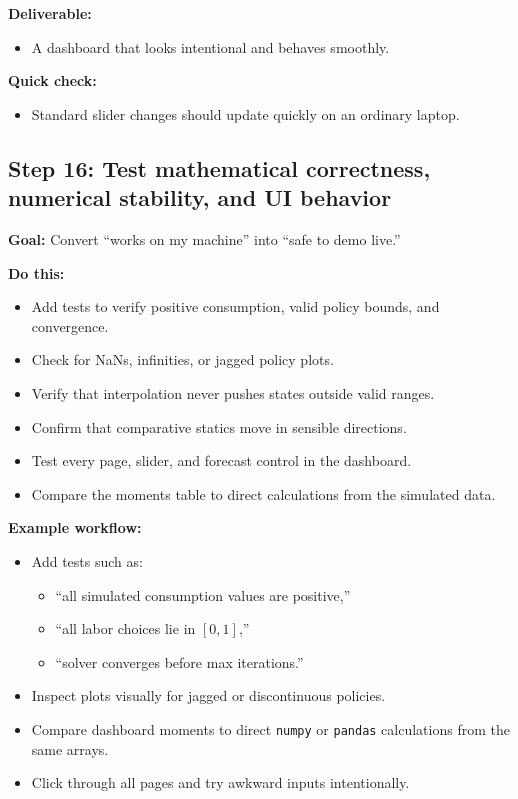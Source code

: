 \documentclass[11pt]{article}
\begin{document}
\textbf{Deliverable:}
\begin{itemize}
    \item A dashboard that looks intentional and behaves smoothly.
\end{itemize}

\textbf{Quick check:}
\begin{itemize}
    \item Standard slider changes should update quickly on an ordinary laptop.
\end{itemize}

\subsection{Step 16: Test mathematical correctness, numerical stability, and UI behavior}
\textbf{Goal:} Convert ``works on my machine'' into ``safe to demo live.''

\textbf{Do this:}
\begin{itemize}
    \item Add tests to verify positive consumption, valid policy bounds, and convergence.
    \item Check for NaNs, infinities, or jagged policy plots.
    \item Verify that interpolation never pushes states outside valid ranges.
    \item Confirm that comparative statics move in sensible directions.
    \item Test every page, slider, and forecast control in the dashboard.
    \item Compare the moments table to direct calculations from the simulated data.
\end{itemize}

\textbf{Example workflow:}
\begin{itemize}
    \item Add tests such as:
    \begin{itemize}
        \item ``all simulated consumption values are positive,''
        \item ``all labor choices lie in \([0,1]\),''
        \item ``solver converges before max iterations.''
    \end{itemize}
    \item Inspect plots visually for jagged or discontinuous policies.
    \item Compare dashboard moments to direct \verb|numpy| or \verb|pandas| calculations from the same arrays.
    \item Click through all pages and try awkward inputs intentionally.
\end{itemize}
\end{document}
